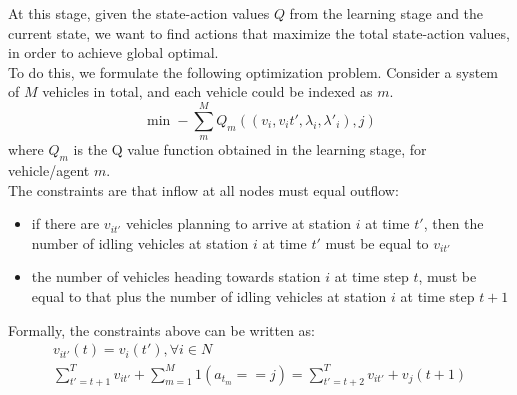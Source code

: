 \documentclass{article}
\begin{document}
At this stage, given the state-action values $Q$ from the learning stage and the current state, we want to find actions that maximize the total state-action values, in order to achieve global optimal. \\

To do this, we formulate the following optimization problem. Consider a system of $M$ vehicles in total, and each vehicle could be indexed as $m$.
\begin{equation}
        \min -\sum_m^M Q_m((v_i,v_it',\lambda_i,\lambda'_i),j)
\end{equation}
where $Q_m$ is the Q value function obtained in the learning stage, for vehicle/agent $m$.\\

The constraints are that inflow at all nodes must equal outflow: 
\begin{itemize}
    \item if there are $v_{it'}$ vehicles planning to arrive at station $i$ at time $t'$, then the number of idling vehicles at station $i$ at time $t'$ must be equal to $v_{it'}$
    \item the number of vehicles heading towards station $i$ at time step $t$, must be equal to that plus the number of  idling vehicles at station $i$ at time step $t+1$
\end{itemize}
Formally, the constraints above can be written as: 
\begin{equation}
    \begin{array}{l}
         v_{it'}(t) = v_i(t'), \forall i\in N \\
         \sum_{t'=t+1}^T v_{it'} + \sum_{m=1}^M 1(a_t_m == j) = \sum_{t'=t+2}^T v_{it'} + v_j(t+1)
    \end{array}
\end{equation}
\end{document}
